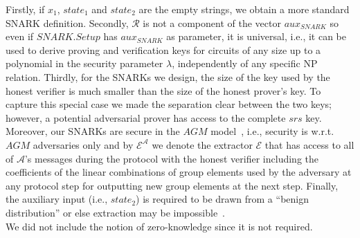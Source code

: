 \vspace{-0.04in}
\noindent Firstly, if $x_1$, $\mathit{state_1}$ and $\mathit{state_2}$ are the empty strings, we obtain a more standard SNARK definition.
Secondly, $\mathcal{R}$ is not a component of the vector $\mathit{aux_{\mathit{SNARK}}}$ so even if $\mathit{SNARK.Setup}$ has 
$\mathit{aux_{\mathit{SNARK}}}$ as parameter, it is universal, 
i.e., it can be used to derive proving and verification keys for circuits of any size up to a polynomial in the security parameter $\lambda$,   
independently of any specific NP relation. Thirdly, for the SNARKs we design, the size of the key used by the honest verifier is much smaller than the size of the honest prover's key. To capture this special case we made the separation clear between the two keys; however, a potential adversarial prover has access to the complete $\mathit{srs}$ key. 
Moreover, our SNARKs are secure in the $\mathit{AGM}$ model~\cite{AGM_model}, i.e., security is w.r.t. $\mathit{AGM}$ 
adversaries only and by $\mathcal{E}^{\mathcal{A}}$ we denote the 
extractor $\mathcal{E}$ that has access to all of 
$\mathcal{A}$'s messages during the protocol with the honest 
verifier including the coefficients of the linear combinations of 
group elements used by the adversary at any protocol step for outputting new group elements at the next step. Finally, the auxiliary input (i.e., $\mathit{state_2}$) is required to 
be drawn from a ``benign distribution'' or else extraction may be 
impossible~\cite{extractability_limits_1,extractability_limits_2}. \\

\noindent We did not include the notion of zero-knowledge since it is not required.
\vspace{-0.1in}